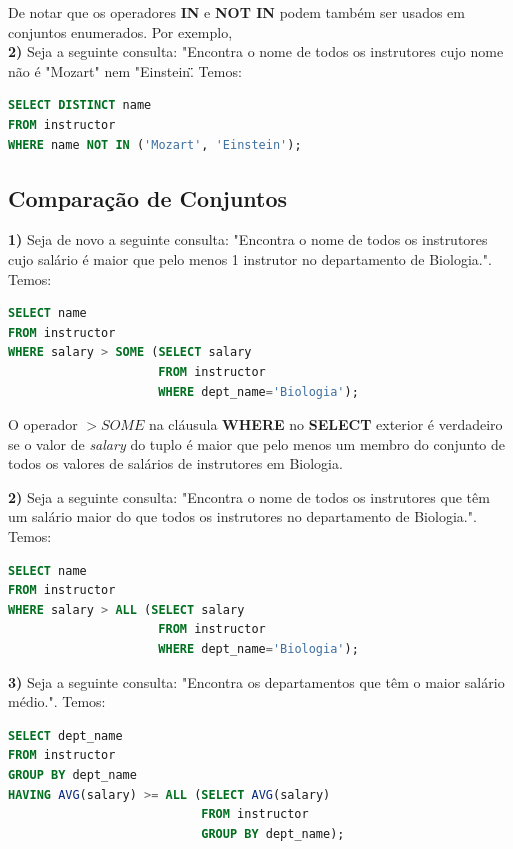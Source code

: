 \documentclass[oneside]{book}
\theoremstyle{definition}
\begin{document}
De notar que os operadores \textbf{IN} e \textbf{NOT IN} podem também ser usados em conjuntos enumerados. Por exemplo, \\
\textbf{2)} Seja a seguinte consulta: "Encontra o nome de todos os instrutores cujo nome não é "Mozart" nem "Einstein\"\". Temos:
\begin{lstlisting}[language=SQL, morekeywords={REFERENCES, REFRESH, MATERIALIZED, CONCURRENTLY}, framesep=8pt, xleftmargin=40pt, framexleftmargin=40pt, frame=tb, framerule=0pt]
SELECT DISTINCT name
FROM instructor
WHERE name NOT IN ('Mozart', 'Einstein');
\end{lstlisting}

\subsection{Comparação de Conjuntos}
\textbf{1)} Seja de novo a seguinte consulta: "Encontra o nome de todos os instrutores cujo salário é maior que pelo menos 1 instrutor no departamento de Biologia.". Temos:
\begin{lstlisting}[language=SQL, morekeywords={REFERENCES, REFRESH, MATERIALIZED, CONCURRENTLY}, framesep=8pt, xleftmargin=40pt, framexleftmargin=40pt, frame=tb, framerule=0pt]
SELECT name
FROM instructor 
WHERE salary > SOME (SELECT salary
                     FROM instructor
                     WHERE dept_name='Biologia');
\end{lstlisting}

O operador $> SOME$ na cláusula \textbf{WHERE} no \textbf{SELECT} exterior é verdadeiro se o valor de \textit{salary} do tuplo é maior que pelo menos um membro do conjunto de todos os valores de salários de instrutores em Biologia.

\textbf{2)} Seja a seguinte consulta: "Encontra o nome de todos os instrutores que têm um salário maior do que todos os instrutores no departamento de Biologia.". Temos:
\begin{lstlisting}[language=SQL, morekeywords={REFERENCES, REFRESH, MATERIALIZED, CONCURRENTLY}, framesep=8pt, xleftmargin=40pt, framexleftmargin=40pt, frame=tb, framerule=0pt]
SELECT name
FROM instructor 
WHERE salary > ALL (SELECT salary
                     FROM instructor
                     WHERE dept_name='Biologia');
\end{lstlisting}

\textbf{3)} Seja a seguinte consulta: "Encontra os departamentos que têm o maior salário médio.". Temos:
\begin{lstlisting}[language=SQL, morekeywords={REFERENCES, REFRESH, MATERIALIZED, CONCURRENTLY}, framesep=8pt, xleftmargin=40pt, framexleftmargin=40pt, frame=tb, framerule=0pt]
SELECT dept_name
FROM instructor 
GROUP BY dept_name
HAVING AVG(salary) >= ALL (SELECT AVG(salary)
                           FROM instructor
                           GROUP BY dept_name);
\end{lstlisting}
\end{document}
